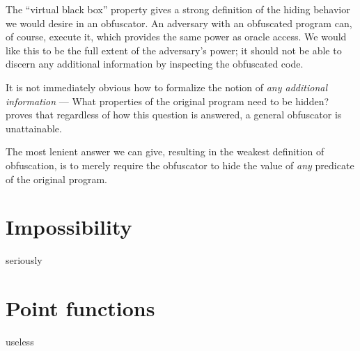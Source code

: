 \documentclass[10pt,twocolumn]{article}
\begin{document}
The ``virtual black box'' property gives a strong definition of the hiding behavior we would desire in an obfuscator.
An adversary with an obfuscated program can, of course, execute it, which provides the same power as oracle access.
We would like this to be the full extent of the adversary's power; it should not be able to discern any additional
information by inspecting the obfuscated code.

It is not immediately obvious how to formalize the notion of \textit{any additional information} ---
What properties of the original program need to be hidden?
\cite{onThe(Im)possibility} proves that regardless of how this question is answered,
a general obfuscator is unattainable.



The most lenient answer we can give, resulting in the weakest definition of obfuscation, is to merely
require the obfuscator to hide the value of \textit{any} predicate of the original program.

%




\section{Impossibility}

seriously

\section{Point functions}

useless



\end{document}
